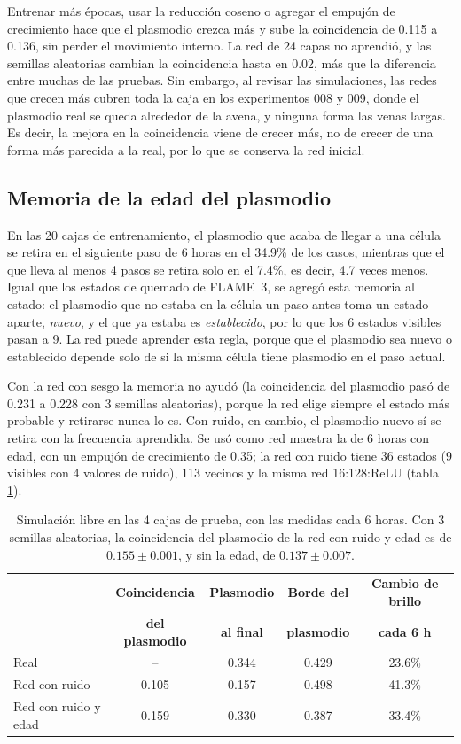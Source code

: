 Entrenar más épocas, usar la reducción coseno o agregar el empujón de crecimiento hace que el plasmodio crezca más y sube la coincidencia de 0.115 a 0.136, sin perder el movimiento interno. La red de 24 capas no aprendió, y las semillas aleatorias cambian la coincidencia hasta en 0.02, más que la diferencia entre muchas de las pruebas. Sin embargo, al revisar las simulaciones, las redes que crecen más cubren toda la caja en los experimentos 008 y 009, donde el plasmodio real se queda alrededor de la avena, y ninguna forma las venas largas. Es decir, la mejora en la coincidencia viene de crecer más, no de crecer de una forma más parecida a la real, por lo que se conserva la red inicial.

\subsection{Memoria de la edad del plasmodio}

En las 20 cajas de entrenamiento, el plasmodio que acaba de llegar a una célula se retira en el siguiente paso de 6 horas en el 34.9\% de los casos, mientras que el que lleva al menos 4 pasos se retira solo en el 7.4\%, es decir, 4.7 veces menos. Igual que los estados de quemado de FLAME~3, se agregó esta memoria al estado: el plasmodio que no estaba en la célula un paso antes toma un estado aparte, \textit{nuevo}, y el que ya estaba es \textit{establecido}, por lo que los 6 estados visibles pasan a 9. La red puede aprender esta regla, porque que el plasmodio sea nuevo o establecido depende solo de si la misma célula tiene plasmodio en el paso actual.

Con la red con sesgo la memoria no ayudó (la coincidencia del plasmodio pasó de 0.231 a 0.228 con 3 semillas aleatorias), porque la red elige siempre el estado más probable y retirarse nunca lo es. Con ruido, en cambio, el plasmodio nuevo sí se retira con la frecuencia aprendida. Se usó como red maestra la de 6 horas con edad, con un empujón de crecimiento de 0.35; la red con ruido tiene 36 estados (9 visibles con 4 valores de ruido), 113 vecinos y la misma red 16:128:ReLU (tabla \ref{tab:physarum_edad}).

\begin{table}[H]
	\centering
	\footnotesize
	\setlength{\tabcolsep}{4pt}
	\begin{tabular}{@{}lcccc@{}}
		\toprule
		& \textbf{Coincidencia} & \textbf{Plasmodio} & \textbf{Borde del} & \textbf{Cambio de brillo} \\
		& \textbf{del plasmodio} & \textbf{al final} & \textbf{plasmodio} & \textbf{cada 6 h} \\ \midrule
		Real & -- & 0.344 & 0.429 & 23.6\% \\
		Red con ruido & 0.105 & 0.157 & 0.498 & 41.3\% \\
		Red con ruido y edad & 0.159 & 0.330 & 0.387 & 33.4\% \\
		\bottomrule
	\end{tabular}
	\caption{Simulación libre en las 4 cajas de prueba, con las medidas cada 6 horas. Con 3 semillas aleatorias, la coincidencia del plasmodio de la red con ruido y edad es de $0.155 \pm 0.001$, y sin la edad, de $0.137 \pm 0.007$.}
	\label{tab:physarum_edad}
\end{table}

